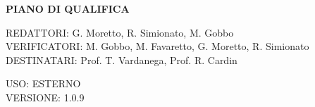 \documentclass[5pt]{article}
\begin{document}
	\vspace{24pt}
	
	\begin{center}
		\textbf{\LARGE PIANO DI QUALIFICA}
	\end{center}
	
	\vspace{13pt}
	
	\begin{flushleft}
		\begin{spacing}{1.5}
			REDATTORI: G. Moretto, R. Simionato, M. Gobbo\\%
			VERIFICATORI: M. Gobbo, M. Favaretto, G. Moretto, R. Simionato\\
			\vspace{7pt}
			DESTINATARI: Prof. T. Vardanega, Prof. R. Cardin\\%
		\end{spacing}
	\end{flushleft}
	
	\begin{flushright}
		\begin{spacing}{1}
			USO: ESTERNO\\
			VERSIONE: 1.0.9\\
		\end{spacing}
	\end{flushright}
	
	
	\restoregeometry
	
	\pagebreak
	
\end{document}
